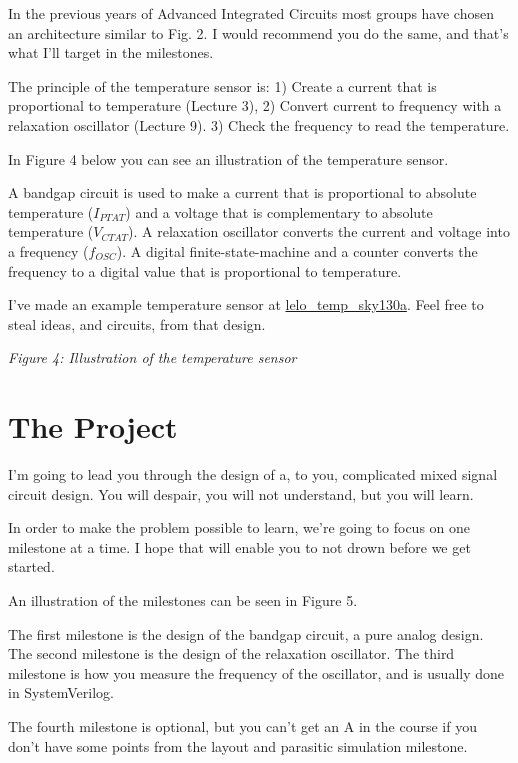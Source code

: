 In the previous years of Advanced Integrated Circuits most groups have
chosen an architecture similar to  Fig.
2. I would recommend you do the same, and that's what I'll target in the
milestones.

The principle of the temperature sensor is: 1) Create a current that is
proportional to temperature (Lecture 3), 2) Convert current to frequency
with a relaxation oscillator (Lecture 9). 3) Check the frequency to read
the temperature.

In Figure 4 below you can see an illustration of the temperature sensor.

A bandgap circuit is used to make a current that is proportional to
absolute temperature (\(I_{PTAT}\)) and a voltage that is complementary
to absolute temperature (\(V_{CTAT}\)). A relaxation oscillator converts
the current and voltage into a frequency (\(f_{OSC}\)). A digital
finite-state-machine and a counter converts the frequency to a digital
value that is proportional to temperature.

I've made an example temperature sensor at
\href{https://analogicus.com/lelo_temp_sky130a/}{lelo\_temp\_sky130a}.
Feel free to steal ideas, and circuits, from that design.


{
\centering
{}
}

\emph{Figure 4: Illustration of the temperature sensor }

\section{The Project}\label{the-project}

I'm going to lead you through the design of a, to you, complicated mixed
signal circuit design. You will despair, you will not understand, but
you will learn.

In order to make the problem possible to learn, we're going to focus on
one milestone at a time. I hope that will enable you to not drown before
we get started.

An illustration of the milestones can be seen in Figure 5.

The first milestone is the design of the bandgap circuit, a pure analog
design. The second milestone is the design of the relaxation oscillator.
The third milestone is how you measure the frequency of the oscillator,
and is usually done in SystemVerilog.

The fourth milestone is optional, but you can't get an A in the course
if you don't have some points from the layout and parasitic simulation
milestone.

